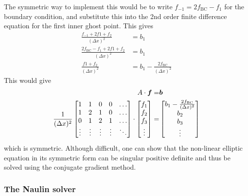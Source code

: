 The symmetric way to implement this would be to write
$f_{-1}=2f_{\text{BC}}-f_{1}$ for the boundary condition, and substitute this
into the 2nd order finite difference equation for the first inner ghost point.
This gives
%
\begin{align*}
    \frac{f_{-1}+2f{1}+f_{2}}{(\Delta x)^2}&=b_1\\
    \frac{2f_{\text{BC}}-f_{1}+2f{1}+f_{2}}{(\Delta x)^2}&=b_1\\
    \frac{f{1}+f_{2}}{(\Delta x)^2}&=b_1 - \frac{2f_{\text{BC}}}{(\Delta x)^2}
\end{align*}
%
This would give
%
\begin{align*}
    A\cdot\boldsymbol{f}=&\boldsymbol{b}\\
    \frac{1}{(\Delta x)^2}
    \begin{bmatrix}
        1                       & 1                       & 0 & 0 & \ldots\\
        1                       & 2                       & 1 & 0 & \ldots\\
        0                       & 1                       & 2 & 1 & \ldots\\
        \vdots                  & \vdots              &\vdots&\vdots&\ddots\\
    \end{bmatrix}
    \cdot
    \begin{bmatrix}
        f_{1}\\
        f_{2}\\
        f_{3}\\
        \vdots
    \end{bmatrix}
    =&
    \begin{bmatrix}
        b_{1} - \frac{2f_{\text{BC}}}{(\Delta x)^2}\\
        b_{2}\\
        b_{3}\\
        \vdots
    \end{bmatrix}
\end{align*}
%
which is symmetric. Although difficult, one can show that the non-linear
elliptic equation in its symmetric form can be singular positive definite and
thus be solved using the conjugate gradient method.

\subsubsection{The Naulin solver}
%






